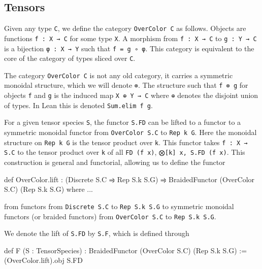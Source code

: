 \documentclass[a4paper, 11pt]{article}
\DeclareRobustCommand{\myinline}{\lstinline}
\begin{document}
\subsection{Tensors} 

Given any type \myinline|C|, we define the category \myinline|OverColor C| as follows. 
Objects are functions \myinline|f : X → C| for some type \myinline|X|. A morphism from
\myinline|f : X → C| to \myinline|g : Y → C| is a bijection
\myinline|φ : X → Y| such that \myinline|f = g ∘ φ|. This category is equivalent to the core of the
category of types sliced over \myinline|C|. 

The category \myinline|OverColor C| is not any old category, it carries a symmetric monoidal structure,
which we will denote \myinline|⊗|. The structure such that \myinline|f ⊗ g| for objects \myinline|f| and \myinline|g|
is the induced map \myinline|X ⊕ Y → C| where \myinline|⊕| denotes the disjoint union of types.
In Lean this is denoted \myinline|Sum.elim f g|. 

For a given tensor species \myinline|S|, the functor \myinline|S.FD| can be lifted to a functor
to a symmetric monoidal functor from \myinline|OverColor S.C| to \myinline|Rep k G|.
Here the monoidal structure on \myinline|Rep k G| is the tensor product over \myinline|k|.
This functor takes \myinline|f : X → S.C| to the tensor product over \myinline|k| of all \myinline|FD (f x)|,
\myinline|⨂[k] x, S.FD (f x)|. 
This construction is general and functorial, allowing us to define the functor 
\begin{code}
def OverColor.lift : (Discrete S.C ⥤ Rep S.k S.G) ⥤ BraidedFunctor (OverColor S.C) (Rep S.k S.G) where ...
\end{code}
from functors from \myinline|Discrete S.C| to \myinline|Rep S.k S.G|
to symmetric monoidal functors (or braided functors)  from \myinline|OverColor S.C| to \myinline|Rep S.k S.G|.

We denote the lift of \myinline|S.FD| by \myinline|S.F|, which is defined through
\begin{code}
def F  (S : TensorSpecies) : BraidedFunctor (OverColor S.C) (Rep S.k S.G) := 
  (OverColor.lift).obj S.FD
\end{code}
\end{document}
